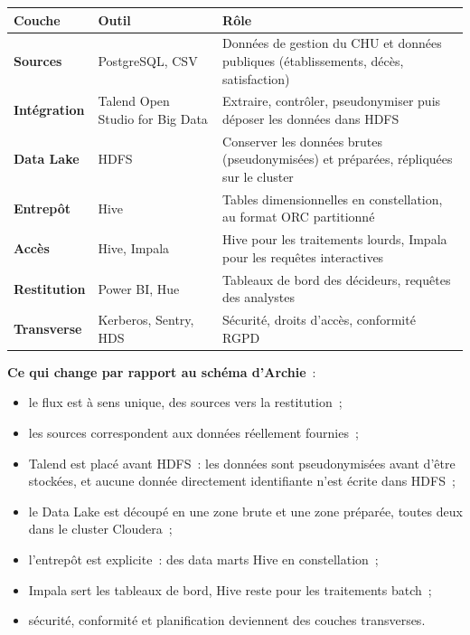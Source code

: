 \begin{center}
\begin{tabularx}{\textwidth}{>{\bfseries}l l >{\raggedright\arraybackslash}X}
\toprule
Couche & Outil & Rôle \\
\midrule
Sources & PostgreSQL, CSV & Données de gestion du CHU et données publiques (établissements, décès, satisfaction) \\
Intégration & Talend Open Studio for Big Data & Extraire, contrôler, pseudonymiser puis déposer les données dans HDFS \\
Data Lake & HDFS & Conserver les données brutes (pseudonymisées) et préparées, répliquées sur le cluster \\
Entrepôt & Hive & Tables dimensionnelles en constellation, au format ORC partitionné \\
Accès & Hive, Impala & Hive pour les traitements lourds, Impala pour les requêtes interactives \\
Restitution & Power BI, Hue & Tableaux de bord des décideurs, requêtes des analystes \\
Transverse & Kerberos, Sentry, HDS & Sécurité, droits d'accès, conformité RGPD \\
\bottomrule
\end{tabularx}
\end{center}

\noindent \textbf{Ce qui change par rapport au schéma d'Archie}~:
\begin{itemize}
	\item le flux est à sens unique, des sources vers la restitution~;
	\item les sources correspondent aux données réellement fournies~;
	\item Talend est placé avant HDFS~: les données sont pseudonymisées avant d'être stockées, et aucune donnée directement identifiante n'est écrite dans HDFS~;
	\item le Data Lake est découpé en une zone brute et une zone préparée, toutes deux dans le cluster Cloudera~;
	\item l'entrepôt est explicite~: des data marts Hive en constellation~;
	\item Impala sert les tableaux de bord, Hive reste pour les traitements batch~;
	\item sécurité, conformité et planification deviennent des couches transverses.
\end{itemize}

